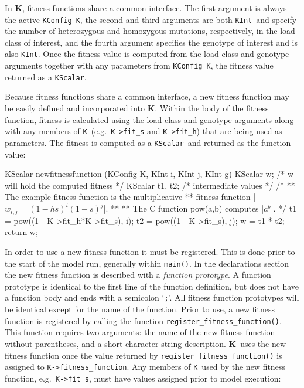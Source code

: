 \documentclass[10pt,twoside,a4paper,fleqn]{report}
\numberwithin{equation}{section}  %
\newcommand{\K}{{\bf K}}
\newcommand{\KK}{\mbox{{\tt K}}}  %
\newcommand{\KScalar}{\mbox{\tt KScalar}}
\newcommand{\KInt}{\mbox{\tt KInt}}
\newcommand{\KConfig}{\mbox{\tt KConfig}}
\begin{document}
{In \K, fitness functions share a common interface.  The first argument is always the active \KConfig\ \KK, the second and third arguments are both \KInt\ and specify the number of heterozygous and homozygous mutations, respectively, in the load class of interest, and the fourth argument specifies the genotype of interest and is also \KInt.  Once the fitness value is computed from the load class and genotype arguments together with any parameters from \KConfig\ \KK, the fitness value returned as a \KScalar.

Because fitness functions share a common interface, a new fitness function may be easily defined and incorporated into \K.
Within the body of the fitness function, fitness is calculated using the load class and genotype arguments along with any members of \KK\ (e.g.\ \lstinline{K->fit_s} and \lstinline{K->fit_h}) that are being used as parameters.  The fitness is computed as a \KScalar\ and returned as the function value:
\begin{C}[gobble=4,mathescape=true,escapechar=|]
    KScalar  newfitnessfunction  (KConfig K, KInt i, KInt j, KInt g)
    {
        KScalar w;       /* w will hold the computed fitness */
        KScalar t1, t2;  /* intermediate values */
        /*
        ** The example fitness function is the multiplicative
        ** fitness function |$w_{i,j}=(1-hs)^{i}(1-s)^{j}$|.
        **
        ** The C function pow(a,b) computes |$a^b$|.
        */
        t1 = pow((1 - K->fit_h*K->fit_s), i);
        t2 = pow((1 - K->fit_s), j);
        w = t1 * t2;
        return w;
    }
\end{C}
In order to use a new fitness function it must be registered.  This is done prior to the start of the model run, generally within \lstinline{main()}.  In the declarations section the new fitness function is described with a {\em function prototype}.  A function prototype is identical to the first line of the function definition, but does not have a function body and ends with a semicolon `\lstinline{;}'.  All fitness function prototypes will be identical except for the name of the function.  Prior to use, a new fitness function is registered by calling the function \lstinline{register_fitness_function()}.  This function requires two arguments: the name of the new fitness function without parentheses, and a short character-string description.  \K\ uses the new fitness function once the value returned by \lstinline{register_fitness_function()} is assigned to \lstinline{K->fitness_function}.  Any members of \KK\ used by the new fitness function, e.g.\  \lstinline{K->fit_s}, must have values assigned prior to model execution:
}
\end{document}
